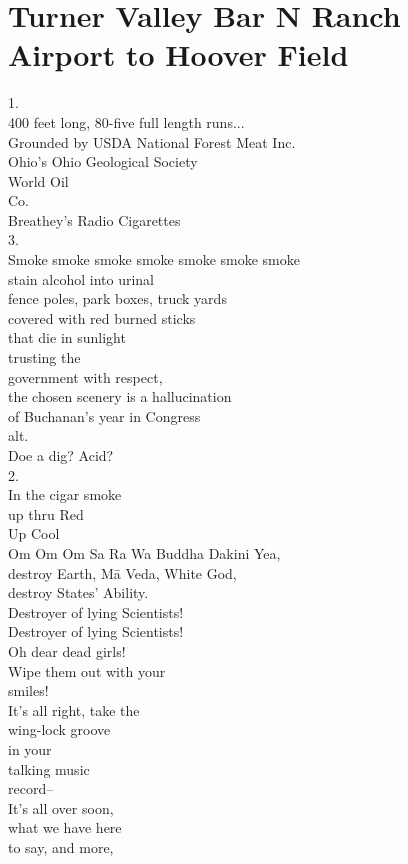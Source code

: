 \documentclass[smalldemyvopaper,11pt,twoside,onecolumn,openright,extrafontsizes]{memoir}
\begin{document}
\chapter{Turner Valley Bar N Ranch Airport to Hoover Field}
1.
\\400 feet long, 80-five full length runs...
\\Grounded by USDA National Forest Meat Inc.
\\Ohio's Ohio Geological Society
\\World Oil
\\Co.
\\Breathey's Radio Cigarettes
\\3.
\\Smoke smoke smoke smoke smoke smoke smoke
\\stain alcohol into urinal
\\fence poles, park boxes, truck yards
\\covered with red burned sticks
\\that die in sunlight
\\trusting the
\\government with respect,
\\the chosen scenery is a hallucination
\\of Buchanan's year in Congress
\\alt.
\\Doe a dig? Acid?
\\2.
\\In the cigar smoke
\\up thru Red
\\Up Cool
\\Om Om Om Sa Ra Wa Buddha Dakini Yea,
\\destroy Earth, Mā Veda, White God,
\\destroy States' Ability.
\\Destroyer of lying Scientists!
\\Destroyer of lying Scientists!
\\Oh dear dead girls!
\\Wipe them out with your
\\smiles!
\\It's all right, take the
\\wing-lock groove
\\in your
\\talking music
\\record--
\\It's all over soon,
\\what we have here
\\to say, and more,
\end{document}
